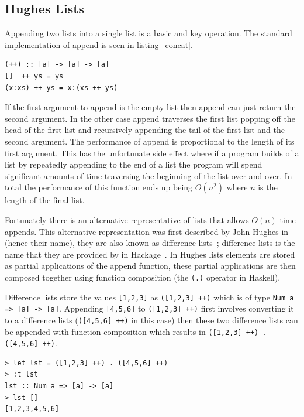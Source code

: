 \subsection{Hughes Lists}

Appending two lists into a single list is a basic and key operation. The standard implementation of append is seen in listing~\ref{concat}. 

\begin{lstlisting}[caption={The standard definition of concat},label=concat]
(++) :: [a] -> [a] -> [a]
[]  ++ ys = ys
(x:xs) ++ ys = x:(xs ++ ys)
\end{lstlisting}

If the first argument to append is the empty list then append can just return the second argument. In the other case append traverses the first list popping off the head of the first list and recursively appending the tail of the first list and the second argument. The performance of append is proportional to the length of its first argument. This has the unfortunate side effect where if a program builds of a list by repeatedly appending  to the end of a list the program will spend significant amounts of time traversing the beginning of the list over and over. In total the performance of this function ends up being $O(n^2)$ where $n$ is the length of the final list.

Fortunately there is an alternative representative of lists that allows $O(n)$ time appends. This alternative representation was first described by John Hughes in~\citep{hughesList} (hence their name), they are also known as difference lists~\citep{realWorldHaskell}; difference lists is the name that they are provided by in Hackage~\citep{dlist}. In Hughes lists elements are stored as partial applications of the append function, these partial applications are then composed together using function composition (the \texttt{(.)} operator in Haskell). 

Difference lists store the values \texttt{[1,2,3]} as \texttt{([1,2,3] ++)} which is of type \texttt{Num a => [a] -> [a]}. Appending \texttt{[4,5,6]} to \texttt{([1,2,3] ++)} first involves converting it to a difference lists (\texttt{([4,5,6] ++)} in this case) then these two difference lists can be appended with function composition which results in \texttt{([1,2,3] ++) . ([4,5,6] ++)}. 

\begin{lstlisting}[caption={Building and deconstructing difference lists.},label=ghciDList]
> let lst = ([1,2,3] ++) . ([4,5,6] ++)
> :t lst
lst :: Num a => [a] -> [a]
> lst []
[1,2,3,4,5,6]
\end{lstlisting}


